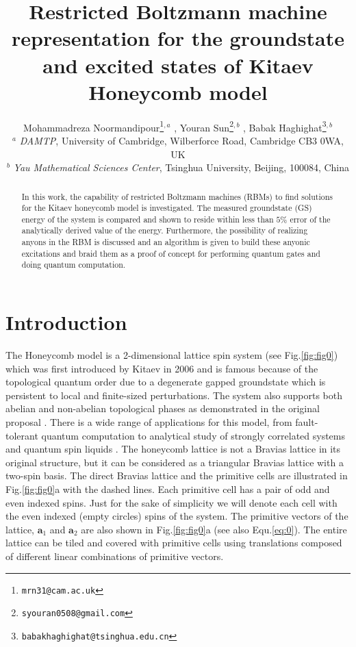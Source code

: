 \documentclass{article}
\title{Restricted Boltzmann machine representation for the groundstate and excited states of Kitaev Honeycomb model}
\author{
    Mohammadreza Noormandipour\thanks{\texttt{mrn31@cam.ac.uk}}\hspace{1mm}$^{,a}$ , Youran Sun\thanks{\texttt{syouran0508@gmail.com}}\hspace{1mm}$^{,b}$ , Babak Haghighat\thanks{\texttt{babakhaghighat@tsinghua.edu.cn}}\hspace{1mm}$^{,b}$ \\
	$^{a}$ \textit{DAMTP}, University of Cambridge, Wilberforce Road, Cambridge CB3 0WA, UK \\
	$^{b}$ \textit{Yau Mathematical Sciences Center}, Tsinghua University, Beijing, 100084, China\\
}
\begin{document}
\maketitle

\begin{abstract}
In this work, the capability of restricted Boltzmann machines (RBMs) to find solutions for the Kitaev honeycomb model is investigated. The measured groundstate (GS) energy of the system is compared and shown to reside within less than $5\%$ error of the analytically derived value of the energy. Furthermore, the possibility of realizing anyons in the RBM is discussed and an algorithm is given to build these anyonic excitations and braid them as a proof of concept for performing quantum gates and doing quantum computation.
\end{abstract}




\section{Introduction}
The Honeycomb model is a 2-dimensional lattice spin system (see Fig.\hspace{0.2mm}\ref{fig:fig0}) which was first introduced by Kitaev in 2006 \cite{Kitaev_2006} and is famous because of the topological quantum order due to a degenerate gapped groundstate which is persistent to local and finite-sized perturbations. The system also supports both abelian and non-abelian topological phases as demonstrated in the original proposal \cite{Kitaev_2006}. There is a wide range of applications for this model, from fault-tolerant quantum computation \cite{Kitaev_2003} to analytical study of strongly correlated systems \cite{Jackeli_2009} and quantum spin liquids \cite{Tikhonov_2011}. The honeycomb lattice is not a Bravias lattice in its original structure, but it can be considered as a triangular Bravias lattice with a two-spin basis. The direct Bravias lattice and the primitive cells are illustrated in Fig.\hspace{0.2mm}\ref{fig:fig0}a with the dashed lines. Each primitive cell has a pair of odd and even indexed spins. Just for the sake of simplicity we will denote each cell with the even indexed (empty circles) spins of the system. The primitive vectors of the lattice, $\textbf{a}_1$ and $\textbf{a}_2$ are also shown in Fig.\hspace{0.2mm}\ref{fig:fig0}a (see also Equ.\hspace{0.2mm}\ref{eq:0}). The entire lattice can be tiled and covered with primitive cells using translations composed of different linear combinations of primitive vectors. 
\end{document}
